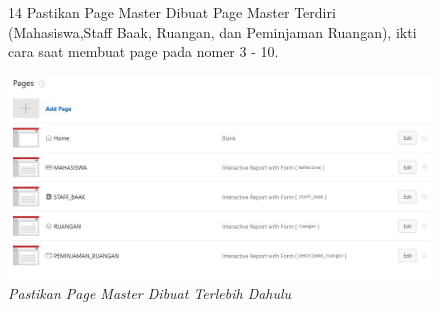 \begin{itemize}
        \begin{figure}[!htbp]
        \item[14]Pastikan Page Master Dibuat Page Master Terdiri (Mahasiswa,Staff Baak, Ruangan, dan Peminjaman Ruangan), ikti cara saat membuat page pada nomer 3 - 10.
        \begin{center}
        \includegraphics[scale=0.4]{figures/pastikan_page_master_dibuat_terlebih_dahulu.jpg}
        \caption{\textit{Pastikan Page Master Dibuat Terlebih Dahulu}}
        \end{center}
        \end{figure}
        

\end{itemize}
